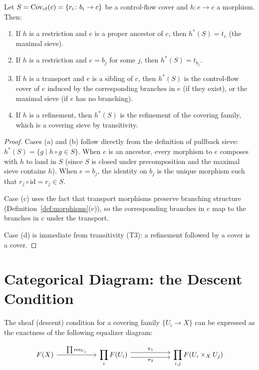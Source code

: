 \documentclass[11pt]{article}
\begin{document}
\begin{lemma}\label{lem:pullback-cf}
Let $S = \mathrm{Cov}_{\mathrm{cf}}(c) = \{r_i \colon b_i \to c\}$ be a control-flow
cover and $h \colon e \to c$ a morphism.  Then:
\begin{enumerate}[label=(\alph*),nosep]
  \item If $h$ is a restriction and $e$ is a proper ancestor of $c$, then
        $h^*(S) = t_e$ (the maximal sieve).
  \item If $h$ is a restriction and $e = b_j$ for some $j$, then
        $h^*(S) = t_{b_j}$.
  \item If $h$ is a transport and $e$ is a sibling of $c$, then
        $h^*(S)$ is the control-flow cover of $e$ induced by the corresponding
        branches in $e$ (if they exist), or the maximal sieve (if $e$ has no
        branching).
  \item If $h$ is a refinement, then $h^*(S)$ is the refinement of the
        covering family, which is a covering sieve by transitivity.
\end{enumerate}
\end{lemma}

\begin{proof}
Cases (a) and (b) follow directly from the definition of pullback sieve:
$h^*(S) = \{g \mid h \circ g \in S\}$.  When $e$ is an ancestor, every
morphism to $e$ composes with $h$ to land in $S$ (since $S$ is closed under
precomposition and the maximal sieve contains $h$).  When $e = b_j$, the
identity on $b_j$ is the unique morphism such that $r_j \circ \mathrm{id} = r_j \in S$.

Case (c) uses the fact that transport morphisms preserve branching structure
(Definition~\ref{def:morphisms}(c)), so the corresponding branches in $e$
map to the branches in $c$ under the transport.

Case (d) is immediate from transitivity (T3): a refinement followed by a
cover is a cover.
\end{proof}

\section{Categorical Diagram: the Descent Condition}\label{app:descent}

The sheaf (descent) condition for a covering family $\{U_i \to X\}$ can be
expressed as the exactness of the following equalizer diagram:

\[
\begin{tikzcd}[column sep=2cm]
  F(X) \arrow[r, "\prod \res_{U_i}"]
  & \displaystyle\prod_i F(U_i)
    \arrow[r, shift left=0.8ex, "\pi_1"]
    \arrow[r, shift right=0.8ex, "\pi_2"']
  & \displaystyle\prod_{i,j} F(U_i \times_X U_j)
\end{tikzcd}
\]
\end{document}
